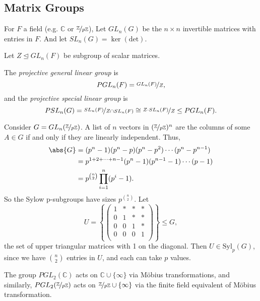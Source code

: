 \subsection{Matrix Groups}
For \(F\) a field (e.g. \(\mathbb{C}\) or \(\nicefrac{\mathbb{Z}}{p\mathbb{Z}}\)), Let \(GL_n(G)\) be the \(n\times n\) invertible matrices with entries in \(F\). And let \(SL_n(G) = \ker (\mathrm{det})\).

Let \(Z \trianglelefteq GL_n(F)\) be subgroup of scalar matrices.
\begin{definition}{}{}
    The \textit{projective general linear group} is
    \[
        PGL_n(F) = \nicefrac{GL_n(F)}{Z},
    \]
    and the \textit{projective special linear group} is
    \[
        PSL_n(G) = \nicefrac{SL_n(F)}{Z\cap SL_n(F)} \cong \nicefrac{Z\cdot SL_n(F)}{Z}\leq PGL_n(F).
    \]
\end{definition}
\begin{example}
    Consider \(G = GL_n(\nicefrac{\mathbb{Z}}{p\mathbb{Z}})\). A list of \(n\) vectors in \((\nicefrac{\mathbb{Z}}{p\mathbb{Z}})^n\) are the columns of some \(A\in G\) if and only if they are linearly independent. Thus,
    \begin{align*}
        \abs{G} &= (p^n - 1)(p^n - p)(p^n - p^2)\cdots (p^n - p^{n-1})\\
        &= p^{1 + 2 + \cdots + n - 1}(p^n - 1)(p^{n-1} - 1)\cdots (p-1)\\
        &= p^{\binom{n}{2}}\prod\limits_{i=1}^{n} (p^i - 1).
    \end{align*}
    So the Sylow p-subgroups have sizes \(p^{\binom{n}{2}}\). Let
    \[
        U = \left\{\begin{pmatrix}
            1 & * & * &  * \\
            0 & 1 & * &  * \\
            0 & 0 & 1 &  * \\
            0 & 0 & 0 &  1 \\
        \end{pmatrix}\right\} \leq G,
    \]
    the set of upper triangular matrices with 1 on the diagonal. Then \(U \in \mathrm{Syl}_p(G)\), since we have \(\binom{n}{2}\) entries in \(U\), and each can take \(p\) values.
\end{example}
The group \(PGL_2(\mathbb{C})\) acts on \(\mathbb{C}\cup \{\infty\}\) via Möbius transformations, and similarly, \(PGL_2(\nicefrac{\mathbb{Z}}{p\mathbb{Z}})\) acts on \(\nicefrac{\mathbb{Z}}{p\mathbb{Z}}\cup \{\infty\}\) via the finite field equivalent of Möbius transformation.

